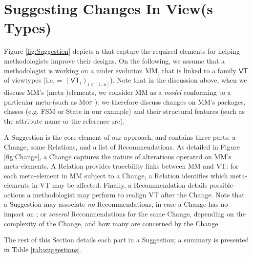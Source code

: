 \section{Suggesting Changes In View(s Types)}
\label{sec:Suggestion}

Figure \ref{fig:Suggestion} depicts a \metamodel that capture the
required elements for helping methodologists improve their designs.
On the following, we assume that a methodologist is working on a \metamodel
under evolution \textsf{MM}, that is linked to a family $\mathsf{VT}$ of viewtypes
(i.e.  = $(\mathsf{VT}_i)_{i\in [1..n]}$). Note that in the discussion above, when we discuss
\textsf{MM}'s (meta-)elements, we consider \textsf{MM} as a \emph{model}
conforming to a particular meta-\metamodel (such as \textsc{Mof} \cite{TR:OMG-MOF:2016}):
we therefore discuss changes on \textsf{MM}'s packages, classes (e.g. 
\textsf{FSM} or \textsf{State} in our example) and their structural features
(such as the attribute \textsf{name} or the reference \textsf{src}).

A \textsf{Suggestion} is the core element of our approach, and contains three 
parts: a \textsf{Change}, some \textsf{Relation}s, and a list of 
\textsf{Recommendation}s. 
%
As detailed in Figure \ref{fig:Change}, a \textsf{Change} captures the nature of
alterations operated on \textsf{MM}'s meta-elements. 
A \textsf{Relation} provides tracebility links between \textsf{MM} and \textsf{VT}:
for each meta-element in \textsf{MM} subject to a \textsf{Change}, a \textsf{Relation}
identifies which meta-elements in \textsf{VT} may be affected. 
Finally, a \textsf{Recommendation} details possible actions a methodologist may 
perform to realign \textsf{VT} after the \textsf{Change}. 
Note that a \textsf{Suggestion} may 
associate \emph{no} \textsf{Recommendation}s, in case a \textsf{Change} has no
impact on \viewtypes; or \emph{several} \textsf{Recommendation}s for the same 
\textsf{Change}, depending on the complexity of the \textsf{Change}, and how 
many \viewtypes are concerned by the \textsf{Change}.

The rest of this Section details each part in a \textsf{Suggestion}; a summary
is presented in Table \ref{tab:suggestions}.





